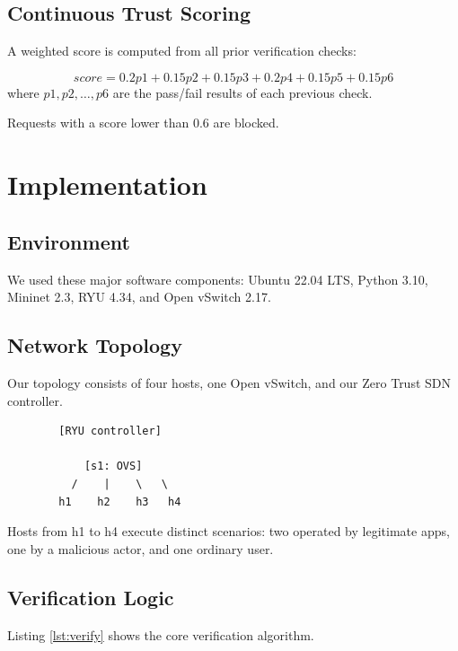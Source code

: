 \documentclass[conference]{IEEEtran}
\begin{document}
\subsection{Continuous Trust Scoring}
A weighted score is computed from all prior verification checks:

\begin{equation}
score = 0.2 p1 + 0.15 p2 + 0.15 p3 + 0.2 p4 + 0.15 p5 + 0.15 p6
\end{equation}
where $p1, p2, \dots, p6$ are the pass/fail results of each previous check.

Requests with a score lower than 0.6 are blocked.

\section{Implementation}

\subsection{Environment}
We used these major software components: Ubuntu 22.04 LTS, Python 3.10, Mininet 2.3, RYU 4.34, and Open vSwitch 2.17.

\subsection{Network Topology}
Our topology consists of four hosts, one Open vSwitch, and our Zero Trust SDN controller.

\begin{verbatim}
        [RYU controller]

            [s1: OVS]
          /    |    \   \ 
        h1    h2    h3   h4
\end{verbatim}
Hosts from h1 to h4 execute distinct scenarios: two operated by legitimate apps, one by a malicious actor, and one ordinary user.

\subsection{Verification Logic}

Listing \ref{lst:verify} shows the core verification algorithm.
\end{document}
